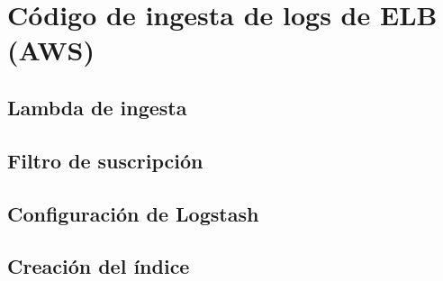 \chapter{Código de ingesta de logs de ELB (AWS)}\label{anexo:elb}
\section{Lambda de ingesta}


\newpage{}
\section{Filtro de suscripción}


\section{Configuración de Logstash}


\newpage{}
\section{Creación del índice}

